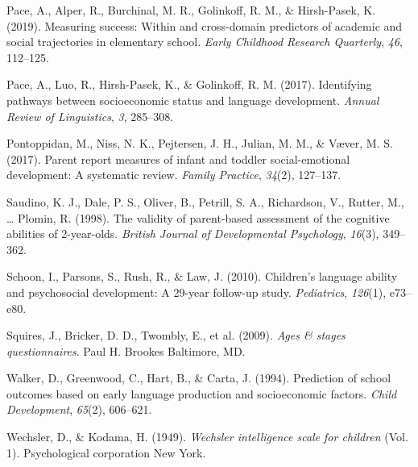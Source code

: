 \documentclass[
  man,floatsintext]{apa6}
\newlength{\cslhangindent}
\newlength{\cslentryspacingunit} %
\newenvironment{CSLReferences}[2] %
 {%
  \setlength{\parindent}{0pt}
  \ifodd #1
  \let\oldpar\par
  \def\par{\hangindent=\cslhangindent\oldpar}
  \fi
  \setlength{\parskip}{#2\cslentryspacingunit}
 }%
 {}
\begin{document}
\begin{CSLReferences}{1}{0}
\leavevmode{}%
Pace, A., Alper, R., Burchinal, M. R., Golinkoff, R. M., \& Hirsh-Pasek, K. (2019). Measuring success: Within and cross-domain predictors of academic and social trajectories in elementary school. \emph{Early Childhood Research Quarterly}, \emph{46}, 112--125.

\leavevmode{}%
Pace, A., Luo, R., Hirsh-Pasek, K., \& Golinkoff, R. M. (2017). Identifying pathways between socioeconomic status and language development. \emph{Annual Review of Linguistics}, \emph{3}, 285--308.

\leavevmode{}%
Pontoppidan, M., Niss, N. K., Pejtersen, J. H., Julian, M. M., \& Væver, M. S. (2017). Parent report measures of infant and toddler social-emotional development: A systematic review. \emph{Family Practice}, \emph{34}(2), 127--137.

\leavevmode{}%
Saudino, K. J., Dale, P. S., Oliver, B., Petrill, S. A., Richardson, V., Rutter, M., \ldots{} Plomin, R. (1998). The validity of parent-based assessment of the cognitive abilities of 2-year-olds. \emph{British Journal of Developmental Psychology}, \emph{16}(3), 349--362.

\leavevmode{}%
Schoon, I., Parsons, S., Rush, R., \& Law, J. (2010). Children's language ability and psychosocial development: A 29-year follow-up study. \emph{Pediatrics}, \emph{126}(1), e73--e80.

\leavevmode{}%
Squires, J., Bricker, D. D., Twombly, E., et al. (2009). \emph{Ages \& stages questionnaires}. Paul H. Brookes Baltimore, MD.

\leavevmode{}%
Walker, D., Greenwood, C., Hart, B., \& Carta, J. (1994). Prediction of school outcomes based on early language production and socioeconomic factors. \emph{Child Development}, \emph{65}(2), 606--621.

\leavevmode{}%
Wechsler, D., \& Kodama, H. (1949). \emph{Wechsler intelligence scale for children} (Vol. 1). Psychological corporation New York.

\end{CSLReferences}
\end{document}
